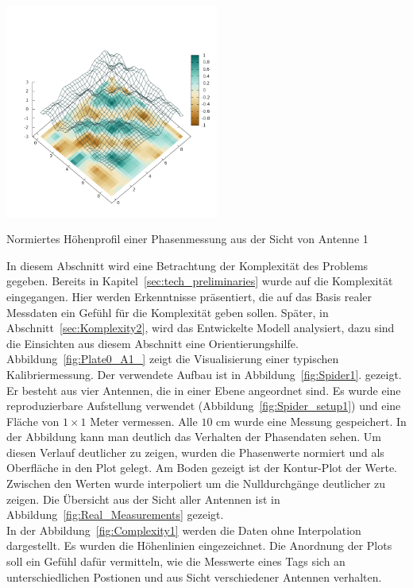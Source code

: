%
\begin{floatingfigure}[hr!]{6cm}
 \centering
         \includegraphics[width=7cm]{img/Plate0_A1.png}
         \caption[Profil einer Phasenmessung]{Normiertes Höhenprofil einer Phasenmessung aus der Sicht von Antenne 1 }
         \label{fig:Plate0_A1_}
\end{floatingfigure}
%
In diesem Abschnitt wird eine Betrachtung der Komplexität des Problems gegeben. Bereits in Kapitel~\ref{sec:tech_preliminaries} wurde auf die Komplexität eingegangen. Hier werden Erkenntnisse präsentiert, die auf das Basis realer Messdaten ein Gefühl für die Komplexität geben sollen. Später, in Abschnitt~\ref{sec:Komplexity2}, wird das Entwickelte Modell analysiert, dazu sind die Einsichten aus diesem Abschnitt eine Orientierungshilfe.\\
%

Abbildung~\ref{fig:Plate0_A1_} zeigt die Visualisierung einer typischen Kalibriermessung. Der verwendete Aufbau ist in Abbildung~\ref{fig:Spider1}. gezeigt. Er besteht aus vier Antennen, die in einer Ebene angeordnet sind. Es wurde eine reproduzierbare Aufstellung verwendet (Abbildung~\ref{fig:Spider_setup1}) und eine Fläche von $1\times1$ Meter vermessen. Alle $10$ cm wurde eine Messung gespeichert. In der Abbildung kann man deutlich das Verhalten der Phasendaten sehen. Um diesen Verlauf deutlicher zu zeigen, wurden die Phasenwerte normiert und als Oberfläche in den Plot gelegt. Am Boden gezeigt ist der Kontur-Plot der Werte. Zwischen den Werten wurde interpoliert um die Nulldurchgänge deutlicher zu zeigen. Die Übersicht aus der Sicht aller Antennen ist in Abbildung~\ref{fig:Real_Measurements} gezeigt.\\
%

In der Abbildung~\ref{fig:Complexity1} werden die Daten ohne Interpolation dargestellt. Es wurden die Höhenlinien eingezeichnet. Die Anordnung der Plots soll ein Gefühl dafür vermitteln, wie die Messwerte eines Tags sich an unterschiedlichen Postionen und aus Sicht verschiedener Antennen verhalten.\\
%

